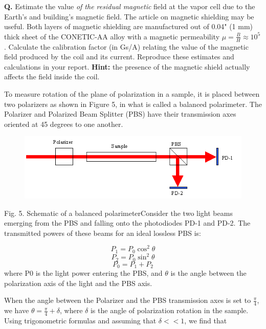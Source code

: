 \documentclass{../lab}
\begin{document}
\textbf{Q.} Estimate the value \emph{of the residual magnetic} field at the vapor cell due to the Earth's and building's magnetic field. The article on magnetic shielding may be useful. Both layers of magnetic shielding are manufactured out of 0.04" (1 mm) thick sheet of the CONETIC-AA alloy with a magnetic permeability $ \mu=\frac{B}{H}\approx 10^5 $. Calculate the calibration factor (in Gs/A) relating the value of the magnetic field produced by the coil and its current. Reproduce these estimates and calculations in your report. \textbf{Hint:} the presence of the magnetic shield actually affects the field inside the coil.

To measure rotation of the plane of polarization in a sample, it is placed between two polarizers as shown in Figure 5, in what is called a balanced polarimeter. The Polarizer and Polarized Beam Splitter (PBS) have their transmission axes oriented at 45 degrees to one another.

\begin{figure}[h]
    \centering
    \href{http://experimentationlab.berkeley.edu/sites/default/files/images/MNOimage008.gif}{\includegraphics[width=0.5\linewidth]{images/MNOimage008.png}}
    \caption{}
    \label{fig:MNOimage008}
\end{figure}


Fig. 5. Schematic of a balanced polarimeterConsider the two light beams emerging from the PBS and falling onto the photodiodes PD-1 and PD-2. The transmitted powers of these beams for an ideal lossless PBS is:

\begin{equation}
    P_1=P_0\cos^2{\theta}
\end{equation}
\begin{equation}
    P_2=P_0\sin^2{\theta}
\end{equation}
\begin{equation}
    P_0=P_1+P_2
\end{equation}
where P0 is the light power entering the PBS, and $ \theta $ is the angle between the polarization axis of the light and the PBS axis.

When the angle between the Polarizer and the PBS transmission axes is set to $ \frac{\pi}{4} $, we have $ \theta=\frac{\pi}{4}+\delta $, where $ \delta $ is the angle of polarization rotation in the sample. Using trigonometric formulas and assuming that $ \delta<<1 $, we find that
\end{document}
